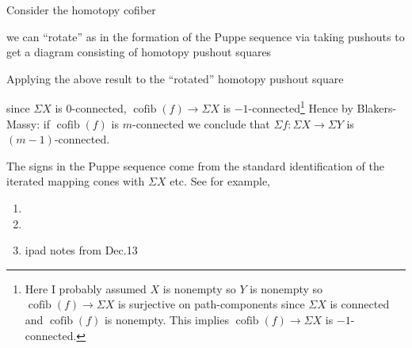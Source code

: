 \documentclass[12pt]{article}
\DeclareMathOperator{\cofib}{\mathrm{cofib}}
\begin{document}
\begin{cor}
Consider the homotopy cofiber
\begin{center}
\end{center}
we can ``rotate'' as in the formation of the Puppe sequence via taking pushouts to get a diagram consisting of homotopy pushout squares
\begin{center}
\end{center}
Applying the above result to the ``rotated'' homotopy pushout square
\begin{center}
\end{center}
since $\Sigma X$ is $0$-connected, $\cofib(f) \to \Sigma X$ is $-1$-connected\footnote{Here I probably assumed $X$ is nonempty so $Y$ is nonempty so $\cofib(f) \to \Sigma X$ is surjective on path-components since $\Sigma X$ is connected and $\cofib(f)$ is nonempty. This implies $\cofib(f) \to \Sigma X$ is $-1$-connected.} Hence by Blakers-Massy: if $\cofib(f)$ is $m$-connected we conclude that $\Sigma f : \Sigma X \to \Sigma Y$ is $(m-1)$-connected.
\end{cor}

\begin{rmk}
The signs in the Puppe sequence come from the standard identification of the iterated mapping cones with $\Sigma X$ etc. See for example,
\begin{enumerate}
\item {}
\item {}
\item ipad notes from Dec.13 
\end{enumerate}
\end{rmk}
\end{document}
